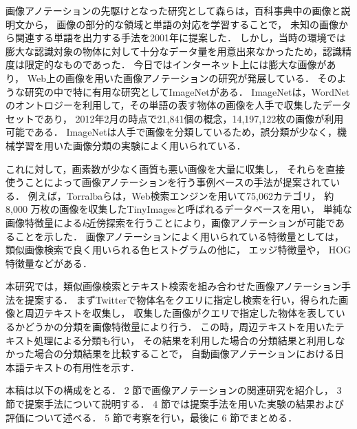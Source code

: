 \documentclass{deimj}
\begin{document}
画像アノテーションの先駆けとなった研究として森ら\cite{mori}は，百科事典中の画像と説明文から，
画像の部分的な領域と単語の対応を学習することで，
未知の画像から関連する単語を出力する手法を2001年に提案した．
しかし，当時の環境では膨大な認識対象の物体に対して十分なデータ量を用意出来なかったため，認識精度は限定的なものであった．
今日ではインターネット上には膨大な画像があり，
Web上の画像を用いた画像アノテーションの研究が発展している．
そのような研究の中で特に有用な研究としてImageNet\cite{imagenet}がある．
ImageNet\cite{imagenet}は，WordNetのオントロジーを利用して，その単語の表す物体の画像を人手で収集したデータセットであり，
2012年2月の時点で21,841個の概念，14,197,122枚の画像が利用可能である．
ImageNetは人手で画像を分類しているため，誤分類が少なく，機械学習を用いた画像分類の実験によく用いられている． 

これに対して，画素数が少なく画質も悪い画像を大量に収集し，
それらを直接使うことによって画像アノテーションを行う事例ベースの手法が提案されている．
例えば，Torralba\cite{torralba}らは，Web検索エンジンを用いて75,062カテゴリ，
約8,000 万枚の画像を収集したTinyImagesと呼ばれるデータベースを用い，
単純な画像特徴量による{\it k}近傍探索を行うことにより，画像アノテーションが可能であることを示した．
%
画像アノテーションによく用いられている特徴量としては，
類似画像検索で良く用いられる色ヒストグラムの他に，
エッジ特徴量や，
HOG特徴量\cite{dalal}などがある．

本研究では，類似画像検索とテキスト検索を組み合わせた画像アノテーション手法を提案する．
まずTwitterで物体名をクエリに指定し検索を行い，得られた画像と周辺テキストを収集し，
収集した画像がクエリで指定した物体を表しているかどうかの分類を画像特徴量により行う．
この時，周辺テキストを用いたテキスト処理による分類も行い，
その結果を利用した場合の分類結果と利用しなかった場合の分類結果を比較することで，
自動画像アノテーションにおける日本語テキストの有用性を示す．

本稿は以下の構成をとる．
2
節で画像アノテーションの関連研究を紹介し，
3
節で提案手法について説明する．
4
節では提案手法を用いた実験の結果および評価について述べる．
5
節で考察を行い，最後に
6
節でまとめる．
\end{document}
